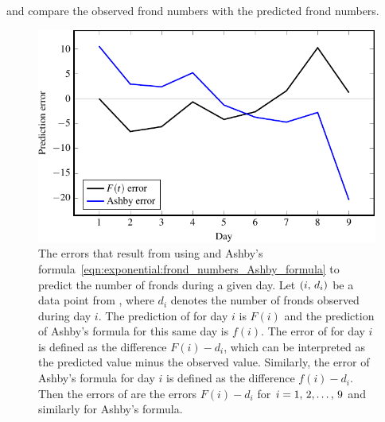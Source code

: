 \documentclass[a4paper,oneside,12pt]{article}
\begin{document}
\begin{problem}
{\begin{solution}
 and
 compare the observed
frond numbers with the predicted frond numbers.

\begin{table}[!htbp]
\centering

\caption{%
  Comparison of the observed frond numbers versus the predicted frond
  numbers.  The predicted frond numbers as calculated by
  are listed, respectively, in the third and fourth columns.  These
  numbers have been rounded to one decimal place.
}
\label{tab:exponential:frond12_compare_mean_Ashby}
\end{table}

\begin{figure}[!htbp]
\centering
\includegraphics[scale=1.1]{image/11/frond-errors.pdf}
\caption{%
  The errors that result from using
   and
  Ashby's formula~\eqref{eqn:exponential:frond_numbers_Ashby_formula}
  to predict the number of fronds during a given day.  Let
  $\left\lparen{i},\, {d_i}\right\rparen$ be a data point from
  , where $d_i$
  denotes the number of fronds observed during day $i$.  The
  prediction of
   for
  day $i$ is $F(i)$ and the prediction of Ashby's formula for this
  same day is $f(i)$.  The error of
   for
  day $i$ is defined as the difference $F(i) - d_i$, which can be
  interpreted as the predicted value minus the observed value.
  Similarly, the error of Ashby's formula for day $i$ is defined as
  the difference $f(i) - d_i$.  Then the errors of
   are
  the errors $F(i) - d_i$ for $i = {1},\, {2}, \dots,\, {9}$ and similarly for
  Ashby's formula.
}
\label{fig:exponential:frond_error_analysis}
\end{figure}


\end{solution}}
\end{problem}
\end{document}
